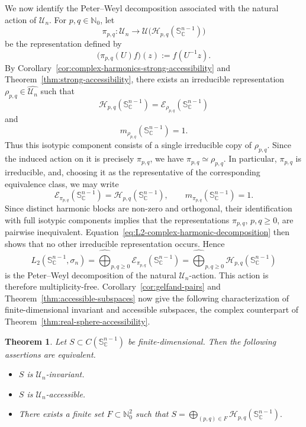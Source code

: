 \documentclass[11pt,showkeys]{amsart}
\newtheorem{theorem}{Theorem}[section]
\begin{document}
We now identify the Peter--Weyl decomposition associated with the
natural action of \(\mathcal U_n\). For \(p,q\in\mathbb N_0\), let
\[
    \pi_{p,q}:\mathcal U_n
    \longrightarrow
    \mathcal U\bigl(
        \mathcal H_{p,q}(\mathbb S_{\mathbb C}^{n-1})
    \bigr)
\]
be the representation defined by
\[
    \bigl(\pi_{p,q}(U)f\bigr)(z)
    :=
    f(U^{-1}z).
\]
By
Corollary~\ref{cor:complex-harmonics-strong-accessibility} and
Theorem~\ref{thm:strong-accessibility}, there exists an irreducible
representation \(\rho_{p,q}\in\widehat{\mathcal U_n}\) such that
\[
    \mathcal H_{p,q}(\mathbb S_{\mathbb C}^{n-1})
    =
    \mathcal E_{\rho_{p,q}}
        (\mathbb S_{\mathbb C}^{n-1})
\]
and
\[
    m_{\rho_{p,q}}
        (\mathbb S_{\mathbb C}^{n-1})
    =
    1.
\]
Thus this isotypic component consists of a single irreducible copy of
\(\rho_{p,q}\). Since the induced action on it is precisely
\(\pi_{p,q}\), we have
\(
    \pi_{p,q}\simeq\rho_{p,q}.
\)
In particular, \(\pi_{p,q}\) is irreducible, and, choosing it as the
representative of the corresponding equivalence class, we may write
\[
    \mathcal E_{\pi_{p,q}}
        (\mathbb S_{\mathbb C}^{n-1})
    =
    \mathcal H_{p,q}(\mathbb S_{\mathbb C}^{n-1}),
    \qquad
    m_{\pi_{p,q}}
        (\mathbb S_{\mathbb C}^{n-1})
    =
    1.
\]
Since distinct harmonic blocks are non-zero and orthogonal, their
identification with full isotypic components implies that the
representations \(\pi_{p,q}\), \(p,q\geq0\), are pairwise inequivalent.
Equation~\eqref{eq:L2-complex-harmonic-decomposition} then shows that
no other irreducible representation occurs. Hence
\[
    L_2(\mathbb S_{\mathbb C}^{n-1},\sigma_n)
    =
    \widehat{\bigoplus}_{p,q\geq 0}
    \mathcal E_{\pi_{p,q}}
        (\mathbb S_{\mathbb C}^{n-1})
    =
    \widehat{\bigoplus}_{p,q\geq 0}
    \mathcal H_{p,q}(\mathbb S_{\mathbb C}^{n-1})
\]
is the Peter--Weyl decomposition of the natural
\(\mathcal U_n\)-action. This action is therefore multiplicity-free.
Corollary~\ref{cor:gelfand-pairs} and
Theorem~\ref{thm:accessible-subspaces} now give the following
characterization of finite-dimensional invariant and accessible
subspaces, the complex counterpart of
Theorem~\ref{thm:real-sphere-accessibility}.

\begin{theorem}
\label{thm:complex-sphere-accessibility}
Let
\(
    S\subset C(\mathbb S_{\mathbb C}^{n-1})
\)
be finite-dimensional. Then the following assertions are equivalent.
\begin{itemize}
\item[(1)] \(S\) is \(\mathcal U_n\)-invariant.
\item[(2)] \(S\) is \(\mathcal U_n\)-accessible.
\item[(3)] There exists a finite set
      \(F\subset\mathbb N_0^2\) such that
\(
    S
    =
    \bigoplus_{(p,q)\in F}
    \mathcal H_{p,q}(\mathbb S_{\mathbb C}^{n-1}).
\)
\end{itemize}
\end{theorem}
\end{document}
